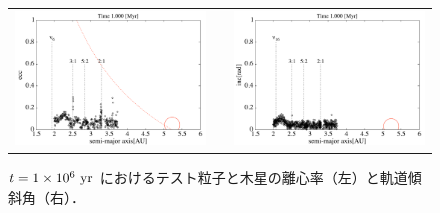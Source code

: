 \documentclass[11pt,a4paper,oneside,onecolumn]{jreport}
\begin{document}
\begin{figure}[H]
\begin{tabular}{ccc}
\begin{minipage}[t]{0.45\hsize}
\centering
\includegraphics[width=8cm]{./image/asteroid_ecc_1Myr.pdf}
\end{minipage} &
\begin{minipage}[t]{0.1\hsize}
\end{minipage} &
\begin{minipage}[t]{0.45\hsize}
\centering
\includegraphics[width=8cm]{./image/asteroid_inc_1Myr.pdf}
\end{minipage}\\
%
\end{tabular}
\caption{$t = 1 \times 10^6\ {\rm yr}$ におけるテスト粒子と木星の離心率（左）と軌道傾斜角（右）．\label{fig:asteroid_ecc_inc_1Myr}}
\end{figure}
\end{document}
